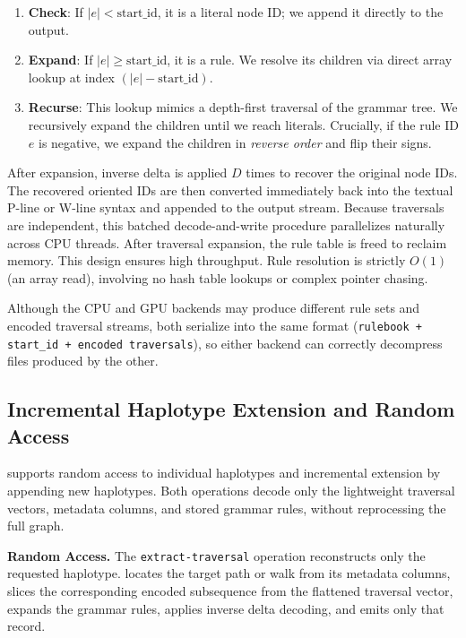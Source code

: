\begin{enumerate}[noitemsep, topsep=2pt, leftmargin=*]
  \item \textbf{Check}: If $|e| < \text{start\_id}$, it is a literal node ID; we append it directly to the output.
  \item \textbf{Expand}: If $|e| \ge \text{start\_id}$, it is a rule. We resolve its children via direct array lookup at index $(|e| - \text{start\_id})$.
  \item \textbf{Recurse}: This lookup mimics a depth-first traversal of the grammar tree. We recursively expand the children until we reach literals. Crucially, if the rule ID $e$ is negative, we expand the children in \emph{reverse order} and flip their signs.
\end{enumerate}


\noindent After expansion, inverse delta is applied $D$ times to recover the original node IDs. The recovered oriented IDs are then converted immediately back into the textual P-line or W-line syntax and appended to the output stream. Because traversals are independent, this batched decode-and-write procedure parallelizes naturally across CPU threads. After traversal expansion, the rule table is freed to reclaim memory.
This design ensures high throughput. Rule resolution is strictly $O(1)$ (an array read), involving no hash table lookups or complex pointer chasing.



Although the CPU and GPU backends may produce different rule sets and encoded traversal streams, both serialize into the same format (\texttt{rulebook + start\_id + encoded traversals}), so either backend can correctly decompress files produced by the other.

\subsection{Incremental Haplotype Extension and Random Access}\label{subsec:random-access}

\gfaz supports random access to individual haplotypes and incremental extension by appending new haplotypes. Both operations decode only the lightweight traversal vectors, metadata columns, and stored grammar rules, without reprocessing the full graph.

\noindent \textbf{Random Access.}
The \texttt{extract-traversal} operation reconstructs only the requested haplotype. \gfaz locates the target path or walk from its metadata columns, slices the corresponding encoded subsequence from the flattened traversal vector, expands the grammar rules, applies inverse delta decoding, and emits only that record.

